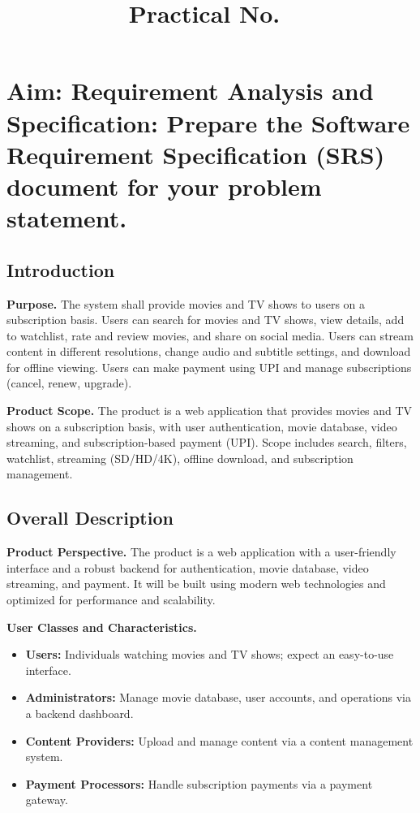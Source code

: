 \documentclass[12pt,a4paper]{article}
\title{\fontsize{16pt}{1.2}\selectfont Practical No.\ \practicalno}
\author{}
\date{}
\newcommand{\sdlcsubsection}[1]{%
  \needspace{7\baselineskip}%
  \subsection*{\fontsize{14pt}{1.2}\selectfont #1}%
  \nopagebreak
}
\begin{document}
\maketitle
\thispagestyle{fancy}
\vspace{-5.5em}

\section*{\fontsize{16pt}{1.2}\selectfont Aim: Requirement Analysis and Specification: Prepare the Software Requirement Specification (SRS) document for your problem statement.}

\fontsize{12pt}{1.2}\selectfont

\sdlcsubsection{Introduction}

\textbf{Purpose.} The system shall provide movies and TV shows to users on a subscription basis. Users can search for movies and TV shows, view details, add to watchlist, rate and review movies, and share on social media. Users can stream content in different resolutions, change audio and subtitle settings, and download for offline viewing. Users can make payment using UPI and manage subscriptions (cancel, renew, upgrade).

\textbf{Product Scope.} The product is a web application that provides movies and TV shows on a subscription basis, with user authentication, movie database, video streaming, and subscription-based payment (UPI). Scope includes search, filters, watchlist, streaming (SD/HD/4K), offline download, and subscription management.

\sdlcsubsection{Overall Description}

\textbf{Product Perspective.} The product is a web application with a user-friendly interface and a robust backend for authentication, movie database, video streaming, and payment. It will be built using modern web technologies and optimized for performance and scalability.

\textbf{User Classes and Characteristics.}
\begin{itemize}
  \item \textbf{Users:} Individuals watching movies and TV shows; expect an easy-to-use interface.
  \item \textbf{Administrators:} Manage movie database, user accounts, and operations via a backend dashboard.
  \item \textbf{Content Providers:} Upload and manage content via a content management system.
  \item \textbf{Payment Processors:} Handle subscription payments via a payment gateway.
\end{itemize}
\end{document}
